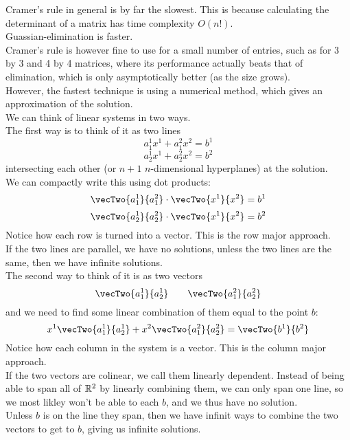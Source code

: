 \documentclass[12pt]{article}
\begin{document}
    Cramer's rule in general is by far the slowest.
    This is because calculating the determinant of
    a matrix has time complexity $O(n!)$. \\
    Guassian-elimination is faster. \\
    Cramer's rule is however fine to use
    for a small number of entries,
    such as for 3 by 3 and 4 by 4 matrices,
    where its performance actually beats
    that of elimination, which is only asymptotically
    better (as the size grows). \\
    However, the fastest technique is using
    a numerical method, which gives an approximation
    of the solution. \\

    We can think of linear systems in two ways. \\

    The first way is to think of it as two lines
    \[ a_1^1x^1 + a_1^2x^2 = b^1 \]
    \[ a_2^1x^1 + a_2^2x^2 = b^2 \]
    intersecting each other (or $n+1$ $n$-dimensional hyperplanes)
    at the solution. \\
    We can compactly write this using dot products:
    \[ \vecTwo{a_1^1}{a_1^2} \cdot \vecTwo{x^1}{x^2}
    = b^1 \]
    \[ \vecTwo{a_2^1}{a_2^2} \cdot \vecTwo{x^1}{x^2}
    = b^2 \]
    Notice how each row is turned into a vector.
    This is the row major approach. \\
    If the two lines are parallel, we have no solutions,
    unless the two lines are the same, then we have
    infinite solutions. \\

    The second way to think of it is as two vectors
    \[ \vecTwo{a_1^1}{a_2^1} \qquad \vecTwo{a_1^2}{a_2^2} \]
    and we need to find some linear combination of them
    equal to the point $b$: 
    \[ x^1\vecTwo{a_1^1}{a_2^1} + x^2\vecTwo{a_1^2}{a_2^2}
    = \vecTwo{b^1}{b^2} \]
    Notice how each column in the system is a vector.
    This is the column major approach. \\
    If the two vectors are colinear,
    we call them linearly dependent.
    Instead of being able to span all of $\mathbb{R}^2$
    by linearly combining them, we can only span one line,
    so we most likley won't be able to each $b$,
    and we thus have no solution. \\
    Unless $b$ is on the line they span,
    then we have infinit ways to combine the two vectors
    to get to $b$, giving us infinite solutions. \\
\end{document}
